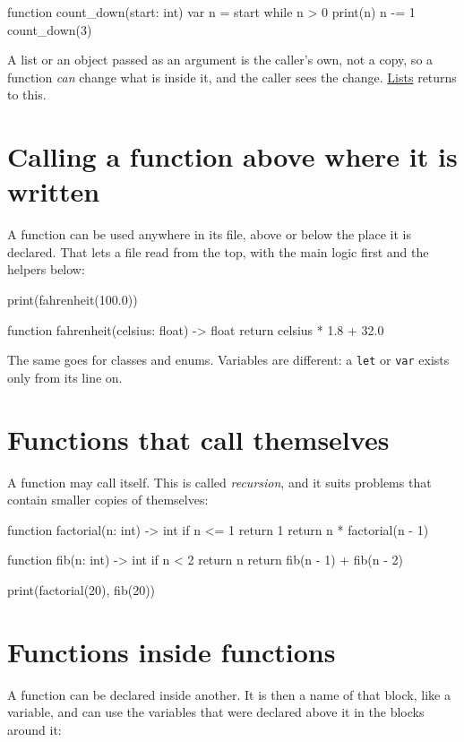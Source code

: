 \begin{zeno}
function count_down(start: int) {
    var n = start
    while n > 0 {
        print(n)
        n -= 1
    }
}
count_down(3)
\end{zeno}

A list or an object passed as an argument is the caller's own, not a
copy, so a function \emph{can} change what is inside it, and the
caller sees the change. \hyperref[ch-lists]{Lists} returns to this.

\section{Calling a function above where it is written}

A function can be used anywhere in its file, above or below the place
it is declared. That lets a file read from the top, with the main
logic first and the helpers below:

\begin{zeno}
print(fahrenheit(100.0))

function fahrenheit(celsius: float) -> float {
    return celsius * 1.8 + 32.0
}
\end{zeno}

The same goes for classes and enums. Variables are different: a
\verb|let| or \verb|var| exists only from its line on.

\section{Functions that call themselves}

A function may call itself. This is called \emph{recursion}, and it
suits problems that contain smaller copies of themselves:

\begin{zeno}
function factorial(n: int) -> int {
    if n <= 1 {
        return 1
    }
    return n * factorial(n - 1)
}

function fib(n: int) -> int {
    if n < 2 {
        return n
    }
    return fib(n - 1) + fib(n - 2)
}

print(factorial(20), fib(20))
\end{zeno}

\section{Functions inside functions}

A function can be declared inside another. It is then a name of that
block, like a variable, and can use the variables that were declared
above it in the blocks around it:

